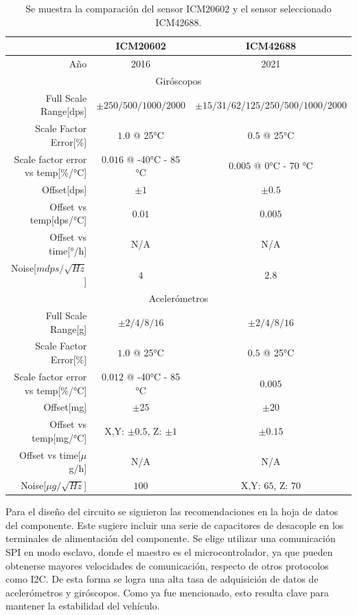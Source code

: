 \begin{table}[htb]
    \centering
    \begin{tabular}{|r||c|c|}
        \hline
         & ICM20602 & ICM42688 \\
        \hline
        Año & 2016 & 2021\\
        \hline
        \multicolumn{3}{|c|}{Giróscopos}\\
        \hline
        Full Scale Range[dps] & $\pm 250/500/1000/2000$ & $\pm 15/31/62/125/250/500/1000/2000$\\
        Scale Factor Error[\%] & $1.0$ @ 25°C & $0.5$ @ 25°C\\
        Scale factor error vs temp[\%/°C] & $0.016$ @ -40°C - 85 °C & $0.005$ @ 0°C - 70 °C\\
        Offset[dps] & $\pm 1$ & $\pm 0.5$\\
        Offset vs temp[dps/°C] & $0.01$ & $0.005$\\
        Offset vs time[°/h] & N/A & N/A\\
        Noise[$mdps/\sqrt{Hz}$] & $4$ & $2.8$\\
        \hline
        \multicolumn{3}{|c|}{Acelerómetros}\\
        \hline
        Full Scale Range[g] & $\pm 2/4/8/16$ & $\pm 2/4/8/16 $\\
        Scale Factor Error[\%] & $1.0$ @ 25°C & $0.5$ @ 25°C\\
        Scale factor error vs temp[\%/°C] & $0.012$ @ -40°C - 85 °C & $0.005$\\
        Offset[mg] & $\pm 25$ & $\pm 20$\\
        Offset vs temp[mg/°C] & X,Y: $\pm 0.5$, Z: $\pm 1$ & $\pm 0.15$\\
        Offset vs time[$\mu$g/h] & N/A & N/A\\
        Noise[$\mu g/\sqrt{Hz}$] & $100$ & X,Y: $65$, Z: $70$\\        
        \hline       
    \end{tabular}
    \caption{Se muestra la comparación del sensor ICM20602 y el sensor seleccionado ICM42688.}
    \label{tab:comparacion_IMUs_TDK}
\end{table}

Para el diseño del circuito se siguieron las recomendaciones en la hoja de datos del componente. Este sugiere incluir una serie de capacitores de desacople en los terminales de alimentación del componente. Se elige utilizar una comunicación SPI en modo esclavo, donde el maestro es el microcontrolador, ya que pueden obtenerse mayores velocidades de comunicación, respecto de otros protocolos como I2C. De esta forma se logra una alta tasa de adquisición de datos de acelerómetros y giróscopos. Como ya fue mencionado, esto resulta clave para mantener la estabilidad del vehículo. %

